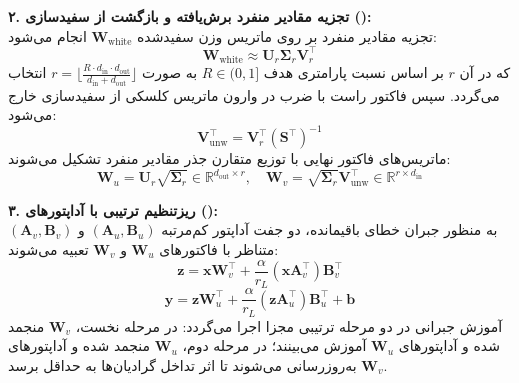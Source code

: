 \textbf{۲. تجزیه مقادیر منفرد برش‌یافته و بازگشت از سفیدسازی ():} \\
تجزیه مقادیر منفرد بر روی ماتریس وزن سفیدشده $\mathbf{W}_{\text{white}}$ انجام می‌شود:
\begin{equation}
\mathbf{W}_{\text{white}} \approx \mathbf{U}_r \mathbf{\Sigma}_r \mathbf{V}_r^\top
\end{equation}
که در آن $r$ بر اساس نسبت پارامتری هدف $R \in (0, 1]$ به صورت $r = \lfloor \frac{R \cdot d_{\text{in}} \cdot d_{\text{out}}}{d_{\text{in}} + d_{\text{out}}} \rfloor$ انتخاب می‌گردد. سپس فاکتور راست با ضرب در وارون ماتریس کلسکی از سفیدسازی خارج می‌شود:
\begin{equation}
\mathbf{V}_{\text{unw}}^\top = \mathbf{V}_r^\top (\mathbf{S}^\top)^{-1}
\end{equation}
ماتریس‌های فاکتور نهایی با توزیع متقارن جذر مقادیر منفرد تشکیل می‌شوند:
\begin{equation}
\mathbf{W}_u = \mathbf{U}_r \sqrt{\mathbf{\Sigma}_r} \in \mathbb{R}^{d_{\text{out}} \times r}, \quad \mathbf{W}_v = \sqrt{\mathbf{\Sigma}_r} \mathbf{V}_{\text{unw}}^\top \in \mathbb{R}^{r \times d_{\text{in}}}
\end{equation}

\textbf{۳. ریزتنظیم ترتیبی با آداپتورهای  ():} \\
به منظور جبران خطای باقیمانده، دو جفت آداپتور کم‌مرتبه $(\mathbf{A}_u, \mathbf{B}_u)$ و $(\mathbf{A}_v, \mathbf{B}_v)$ متناظر با فاکتورهای $\mathbf{W}_u$ و $\mathbf{W}_v$ تعبیه می‌شوند:
\begin{equation}
\mathbf{z} = \mathbf{x} \mathbf{W}_v^\top + \frac{\alpha}{r_L} (\mathbf{x} \mathbf{A}_v^\top) \mathbf{B}_v^\top
\end{equation}
\begin{equation}
\mathbf{y} = \mathbf{z} \mathbf{W}_u^\top + \frac{\alpha}{r_L} (\mathbf{z} \mathbf{A}_u^\top) \mathbf{B}_u^\top + \mathbf{b}
\end{equation}
آموزش جبرانی در دو مرحله ترتیبی مجزا اجرا می‌گردد: در مرحله نخست، $\mathbf{W}_v$ منجمد شده و آداپتورهای $\mathbf{W}_u$ آموزش می‌بینند؛ در مرحله دوم، $\mathbf{W}_u$ منجمد شده و آداپتورهای $\mathbf{W}_v$ به‌روزرسانی می‌شوند تا اثر تداخل گرادیان‌ها به حداقل برسد.

